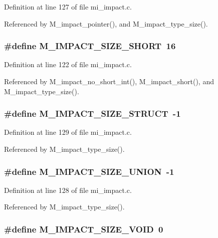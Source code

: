 Definition at line 127 of file mi\_\-impact.c.

Referenced by M\_\-impact\_\-pointer(), and M\_\-impact\_\-type\_\-size().
\subsubsection{\setlength{\rightskip}{0pt plus 5cm}\#define M\_\-IMPACT\_\-SIZE\_\-SHORT~16}\label{mi__impact_8c_b8f73dd98dfe44b339c6fe6019261b82}




Definition at line 122 of file mi\_\-impact.c.

Referenced by M\_\-impact\_\-no\_\-short\_\-int(), M\_\-impact\_\-short(), and M\_\-impact\_\-type\_\-size().
\subsubsection{\setlength{\rightskip}{0pt plus 5cm}\#define M\_\-IMPACT\_\-SIZE\_\-STRUCT~-1}\label{mi__impact_8c_1c651bc6fd50f015d87c6a9a8a5d9aef}




Definition at line 129 of file mi\_\-impact.c.

Referenced by M\_\-impact\_\-type\_\-size().
\subsubsection{\setlength{\rightskip}{0pt plus 5cm}\#define M\_\-IMPACT\_\-SIZE\_\-UNION~-1}\label{mi__impact_8c_b50fe6ddd5d247e0658815b290739055}




Definition at line 128 of file mi\_\-impact.c.

Referenced by M\_\-impact\_\-type\_\-size().
\subsubsection{\setlength{\rightskip}{0pt plus 5cm}\#define M\_\-IMPACT\_\-SIZE\_\-VOID~0}\label{mi__impact_8c_d5a5ea699150eba483e34d459c997d10}




